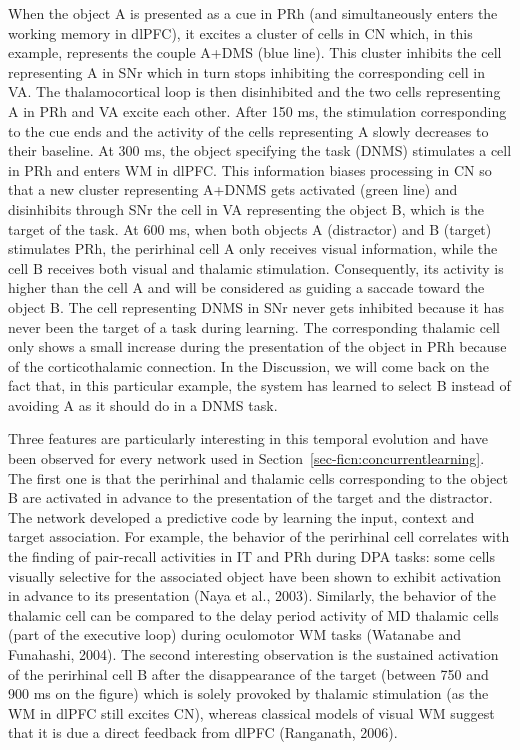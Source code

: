 \documentclass[
  11pt,
  a4paper,
]{scrbook}
\begin{document}
When the object A is presented as a cue in PRh (and simultaneously
enters the working memory in dlPFC), it excites a cluster of cells in CN
which, in this example, represents the couple A+DMS (blue line). This
cluster inhibits the cell representing A in SNr which in turn stops
inhibiting the corresponding cell in VA. The thalamocortical loop is
then disinhibited and the two cells representing A in PRh and VA excite
each other. After 150 ms, the stimulation corresponding to the cue ends
and the activity of the cells representing A slowly decreases to their
baseline. At 300 ms, the object specifying the task (DNMS) stimulates a
cell in PRh and enters WM in dlPFC. This information biases processing
in CN so that a new cluster representing A+DNMS gets activated (green
line) and disinhibits through SNr the cell in VA representing the object
B, which is the target of the task. At 600 ms, when both objects A
(distractor) and B (target) stimulates PRh, the perirhinal cell A only
receives visual information, while the cell B receives both visual and
thalamic stimulation. Consequently, its activity is higher than the cell
A and will be considered as guiding a saccade toward the object B. The
cell representing DNMS in SNr never gets inhibited because it has never
been the target of a task during learning. The corresponding thalamic
cell only shows a small increase during the presentation of the object
in PRh because of the corticothalamic connection. In the Discussion, we
will come back on the fact that, in this particular example, the system
has learned to select B instead of avoiding A as it should do in a DNMS
task.

Three features are particularly interesting in this temporal evolution
and have been observed for every network used in
Section~\ref{sec-ficn:concurrentlearning}. The first one is that the
perirhinal and thalamic cells corresponding to the object B are
activated in advance to the presentation of the target and the
distractor. The network developed a predictive code by learning the
input, context and target association. For example, the behavior of the
perirhinal cell correlates with the finding of pair-recall activities in
IT and PRh during DPA tasks: some cells visually selective for the
associated object have been shown to exhibit activation in advance to
its presentation (Naya et al., 2003). Similarly, the behavior of the
thalamic cell can be compared to the delay period activity of MD
thalamic cells (part of the executive loop) during oculomotor WM tasks
(Watanabe and Funahashi, 2004). The second interesting observation is
the sustained activation of the perirhinal cell B after the
disappearance of the target (between 750 and 900 ms on the figure) which
is solely provoked by thalamic stimulation (as the WM in dlPFC still
excites CN), whereas classical models of visual WM suggest that it is
due a direct feedback from dlPFC (Ranganath, 2006).
\end{document}
